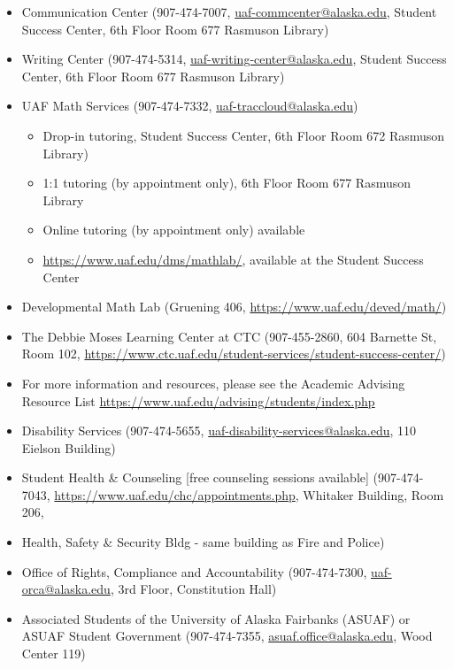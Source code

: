 \documentclass[12pt]{article}
\def\mailto#1{\href{mailto:#1}{#1}}
\begin{document}
\begin{itemize}
\setlength\itemsep{0em}
\item Communication Center (907-474-7007, \mailto{uaf-commcenter@alaska.edu}, Student Success Center, 6th Floor Room 677 Rasmuson Library)
\item Writing Center (907-474-5314, \mailto{uaf-writing-center@alaska.edu}, Student Success Center, 6th Floor Room 677 Rasmuson Library)
\item UAF Math Services (907-474-7332, \mailto{uaf-traccloud@alaska.edu})
\begin{itemize}
\item Drop-in tutoring, Student Success Center, 6th Floor Room 672 Rasmuson Library)
\item 1:1 tutoring (by appointment only), 6th Floor Room 677 Rasmuson Library
\item Online tutoring (by appointment only) available
\item \url{https://www.uaf.edu/dms/mathlab/}, available at the Student Success Center
\end{itemize}
\item Developmental Math Lab (Gruening 406, \url{https://www.uaf.edu/deved/math/})
\item The Debbie Moses Learning Center at CTC (907-455-2860, 604 Barnette St, Room 102, \url{https://www.ctc.uaf.edu/student-services/student-success-center/})
\item For more information and resources, please see the Academic Advising Resource List \url{https://www.uaf.edu/advising/students/index.php}
\end{itemize}





\begin{itemize}
\setlength\itemsep{0em}
\item Disability Services (907-474-5655, \mailto{uaf-disability-services@alaska.edu}, 110 Eielson Building) 
\item Student Health \& Counseling [free counseling sessions available] (907-474-7043, \url{https://www.uaf.edu/chc/appointments.php}, Whitaker Building, Room 206, \item Health, Safety \& Security Bldg - same building as Fire and Police)
\item Office of Rights, Compliance and Accountability (907-474-7300, \mailto{uaf-orca@alaska.edu}, 3rd Floor, Constitution Hall)
\item Associated Students of the University of Alaska Fairbanks (ASUAF) or ASUAF Student Government (907-474-7355, \mailto{asuaf.office@alaska.edu}, Wood Center 119)

\end{itemize}
\end{document}
